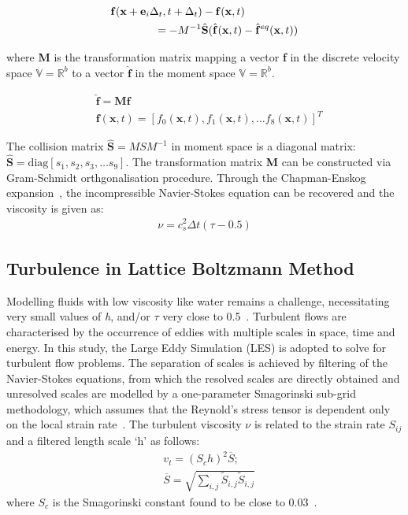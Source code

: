 \documentclass[12pt,a4paper,twocolumn,fleqn]{NARMS}
\begin{document}
\begin{align}
&\mathbf{f}(\mathbf{x}+\mathbf{e}_i\Delta_t, t+ \Delta_t)-\mathbf{f}(\mathbf{x},t) \nonumber \\
&\mbox{\qquad\qquad} = -M^{-1}\hat{\mathbf{S}} (\hat{\mathbf{f}}(\mathbf{x},t)-\hat{\mathbf{f}}^{eq}(\mathbf{x},t))
\end{align}

\noindent where \textbf{M} is the transformation matrix mapping a vector \textbf{f} in the discrete velocity space $\mathds{V}=\mathds{R}^b$ to a vector $\hat{\mathbf{f}}$ in the moment space $\mathds{V}=\mathds{R}^b$.

\begin{align}
&\hat{\mathbf{f}} = \mathbf{M}\mathbf{f}\\
&\mathbf{f}(\mathbf{x},t) = \left[f_0(\mathbf{x},t),f_1(\mathbf{x},t),\dots f_8(\mathbf{x},t)\right]^T
\end{align}

The collision matrix $\hat{\mathbf{S}} = MSM^{-1}$ in moment space is a diagonal matrix: $\hat{\mathbf{S}} =\mbox{diag} \left[ s_1, s_2, s_3,\dots s_9  \right]$. The transformation matrix \textbf{M} can be constructed via Gram-Schmidt orthgonalisation procedure. Through the Chapman-Enskog expansion~, the incompressible Navier-Stokes equation can be recovered and the viscosity is given as:
\begin{align}
\nu=c_s^2\Delta t(\tau-0.5)
\end{align}

\subsection{Turbulence in Lattice Boltzmann Method}
Modelling fluids with low viscosity like water remains a challenge, necessitating very small values of \textit{h}, and/or $\tau$ very close to 0.5~. Turbulent flows are characterised by the occurrence of eddies with multiple scales in space, time and energy. In this study, the Large Eddy Simulation (LES) is adopted to solve for turbulent flow problems. The separation of scales is achieved by filtering of the Navier-Stokes equations, from which the resolved scales are directly obtained and unresolved scales are modelled by a one-parameter Smagorinski sub-grid methodology, which assumes that the Reynold's stress tensor is dependent only on the local strain rate~. The turbulent viscosity $\nu$ is related to the strain rate $S_{ij}$ and a filtered length scale `h' as follows:
\begin{align}
&\mathit{v}_{\mathit{t}}  =  (\mathit{S}_{c}\mathit{h})^{2}\overline{S}; \\
&\overline{S}  = \sqrt{\sum\limits_{\mathit{i,j}}{\tilde{S}_{\mathit{i,j}}\tilde{S}_{\mathit{i,j}}}}
\end{align}
where $\mathit{S}_{c}$ is the Smagorinski constant found to be close to 0.03~.
\end{document}
